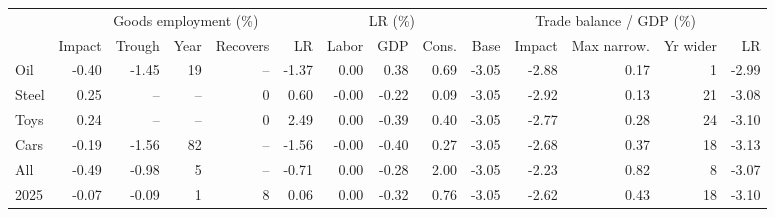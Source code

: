\begin{tabular}{lrrrrrrrrrrrrr}
\toprule
 & \multicolumn{5}{c}{Goods employment (\%)} & \multicolumn{3}{c}{LR (\%)} & \multicolumn{5}{c}{Trade balance / GDP (\%)} \\
\cmidrule(lr){2-6}\cmidrule(lr){7-9}\cmidrule(lr){10-14}
 & Impact & Trough & Year & Recovers & LR & Labor & GDP & Cons. & Base & Impact & Max narrow. & Yr wider & LR \\
\midrule
Oil & -0.40 & -1.45 & 19 & -- & -1.37 & 0.00 & 0.38 & 0.69 & -3.05 & -2.88 & 0.17 & 1 & -2.99 \\
Steel & 0.25 & -- & -- & 0 & 0.60 & -0.00 & -0.22 & 0.09 & -3.05 & -2.92 & 0.13 & 21 & -3.08 \\
Toys & 0.24 & -- & -- & 0 & 2.49 & 0.00 & -0.39 & 0.40 & -3.05 & -2.77 & 0.28 & 24 & -3.10 \\
Cars & -0.19 & -1.56 & 82 & -- & -1.56 & -0.00 & -0.40 & 0.27 & -3.05 & -2.68 & 0.37 & 18 & -3.13 \\
All & -0.49 & -0.98 & 5 & -- & -0.71 & 0.00 & -0.28 & 2.00 & -3.05 & -2.23 & 0.82 & 8 & -3.07 \\
2025 & -0.07 & -0.09 & 1 & 8 & 0.06 & 0.00 & -0.32 & 0.76 & -3.05 & -2.62 & 0.43 & 18 & -3.10 \\
\bottomrule
\end{tabular}
